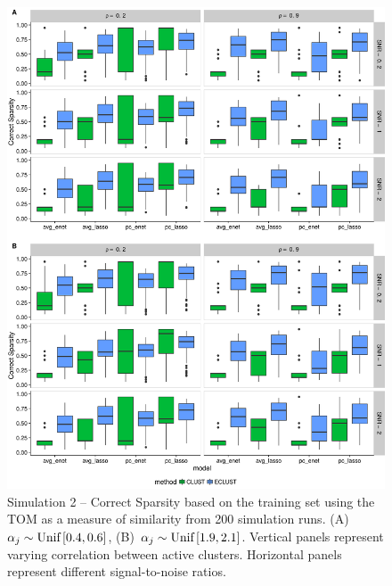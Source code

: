 \begin{appendices}
\begin{figure}[H]
	\centering
	\includegraphics[scale=0.58, keepaspectratio]{./figs/hydra/results/figures/sim2-sept8/CorrectSparsity_TOM_sim2.png}
	\caption{Simulation 2 -- Correct Sparsity based on the training set using the TOM as a measure of similarity from 200 simulation runs. \mbox{(A) $\alpha_{j} \sim \textrm{{Unif}}\left[0.4, 0.6\right]$}, \mbox{(B) $\alpha_{j} \sim \textrm{{Unif}}\left[1.9, 2.1\right]$}. Vertical panels represent varying correlation between active clusters. Horizontal panels represent different signal-to-noise ratios.}
	\label{fig:CorrectSparsity_TOM_sim2}
\end{figure}



\end{appendices}
